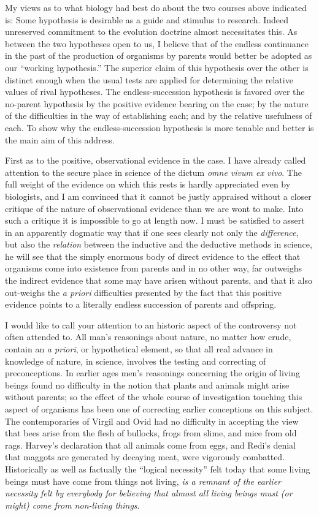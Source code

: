 \documentclass[a4paper, 11pt, oneside, polutonikogreek, english]{article}
\begin{document}
My views as to what biology had best do about the two courses above indicated is: Some hypothesis is desirable as a guide and stimulus to research. Indeed unreserved commitment to the evolution doctrine almost necessitates this. As between the two hypotheses open to us, I believe that of the endless continuance in the past of the production of organisms by parents would better be adopted as our ``working hypothesis.'' The superior claim of this hypothesis over the other is distinct enough when the usual tests are applied for determining the relative values of rival hypotheses. The endless-succession hypothesis is favored over the no-parent hypothesis by the positive evidence bearing on the case; by the nature of the difficulties in the way of establishing each; and by the relative usefulness of each. To show why the endless-succession hypothesis is more tenable and better is the main aim of this address.

First as to the positive, observational evidence in the case. I have already called attention to the secure place in science of the dictum \emph{omne vivum ex vivo}. The full weight of the evidence on which this rests is hardly appreciated even by biologists, and I am convinced that it cannot be justly appraised without a closer critique of the nature of observational evidence than we are wont to make. Into such a critique it is impossible to go at length now. I must be satisfied to assert in an apparently dogmatic way that if one sees clearly not only the \emph{difference}, but also the \emph{relation} between the inductive and the deductive methods in science, he will see that the simply enormous body of direct evidence to the effect that organisms come into existence from parents and in no other way, far outweighs the indirect evidence that some may have arisen without parents, and that it also out-weighs the \emph{a priori} difficulties presented by the fact that this positive evidence points to a literally endless succession of parents and offspring.

I would like to call your attention to an historic aspect of the controversy not often attended to. All man's reasonings about nature, no matter how crude, contain an \emph{a priori}, or hypothetical element, so that all real advance in knowledge of nature, in science, involves the testing and correcting of preconceptions. In earlier ages men's reasonings concerning the origin of living beings found no difficulty in the notion that plants and animals might arise without parents; so the effect of the whole course of investigation touching this aspect of organisms has been one of correcting earlier conceptions on this subject. The contemporaries of Virgil and Ovid had no difficulty in accepting the view that bees arise from the flesh of bullocks, frogs from slime, and mice from old rags. Harvey's declaration that all animals come from eggs, and Redi's denial that maggots are generated by decaying meat, were vigorously combatted. Historically as well as factually the ``logical necessity'' felt today that some living beings must have come from things not living, \emph{is a remnant of the earlier necessity felt by everybody for believing that almost all living beings must (or might) come from non-living things}.
\end{document}

